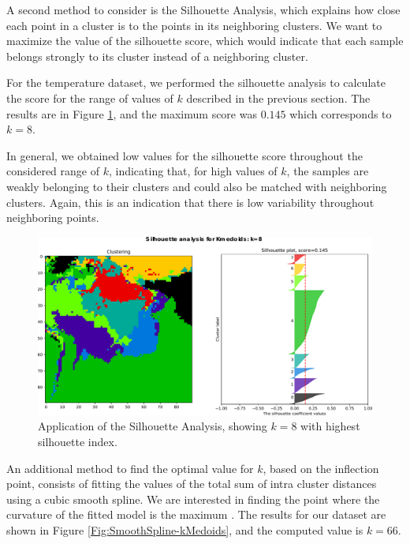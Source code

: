 A second method to consider is the Silhouette Analysis, which explains how close each point in a cluster is to the points in its neighboring clusters. We want to maximize the value of the silhouette score, which would indicate that each sample belongs strongly to its cluster instead of a neighboring cluster.

For the temperature dataset, we performed the silhouette analysis to calculate the score for the range of values of $k$ described in the previous section. The results are in Figure \ref{Fig:Silhouette-kMedoids}, and the maximum score was $0.145$ which corresponds to $k = 8$. 

In general, we obtained low values for the silhouette score throughout the considered range of $k$, indicating that, for high values of $k$, the samples are weakly belonging to their clusters and could also be matched with neighboring clusters. Again, this is an indication that there is low variability throughout neighboring points.

\begin{figure}[h]
	\centering
	\includegraphics[scale=0.50]{../Figures/silhouette-kmedoids_k8_seed0_lite}
	\caption{Application of the Silhouette Analysis, showing $k=8$ with highest silhouette index.}
	\label{Fig:Silhouette-kMedoids}
\end{figure}

An additional method to find the optimal value for $k$, based on the inflection point, consists of fitting the values of the total sum of intra cluster distances using a cubic smooth spline. We are interested in finding the point where the curvature of the fitted model is the maximum \cite{Akima1970}. The results for our dataset are shown in Figure \ref{Fig:SmoothSpline-kMedoids}, and the computed value is $k = 66$.

